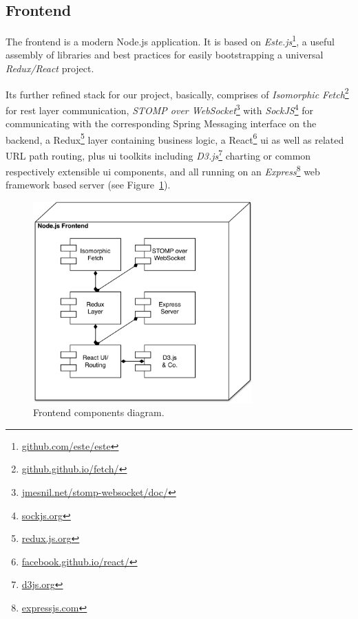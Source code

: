 \subsection{Frontend}

The frontend is a modern Node.js application. It is based on \emph{Este.js}\footnote{\textcolor{blue}{\href{https://github.com/este/este}{github.com/este/este}}}, a useful assembly of libraries and best practices for easily bootstrapping a universal \emph{Redux/React} project.

Its further refined stack for our project, basically, comprises of \emph{Isomorphic Fetch}\footnote{\textcolor{blue}{\href{https://github.github.io/fetch/}{github.github.io/fetch/}}} for \gls{rest} layer communication, \emph{STOMP over WebSocket}\footnote{\textcolor{blue}{\href{http://jmesnil.net/stomp-websocket/doc/}{jmesnil.net/stomp-websocket/doc/}}} with \emph{SockJS}\footnote{\textcolor{blue}{\href{http://sockjs.org/}{sockjs.org}}} for communicating with the corresponding Spring Messaging interface on the backend, a Redux\footnote{\textcolor{blue}{\href{http://redux.js.org/}{redux.js.org}}} layer containing business logic, a React\footnote{\textcolor{blue}{\href{https://facebook.github.io/react/}{facebook.github.io/react/}}} \gls{ui} as well as related URL path routing, plus \gls{ui} toolkits including \emph{D3.js}\footnote{\textcolor{blue}{\href{https://d3js.org/}{d3js.org}}} charting or common respectively extensible \gls{ui} components, and all running on an \emph{Express}\footnote{\textcolor{blue}{\href{http://expressjs.com/}{expressjs.com}}} web framework based server (see Figure~\ref{fig:frontend-components}).

\begin{figure}[h]
  \centering
  \includegraphics[width=0.75\textwidth]{figures/architecture/frontend-components}
  \caption{Frontend components diagram.}
  \label{fig:frontend-components}
\end{figure}

